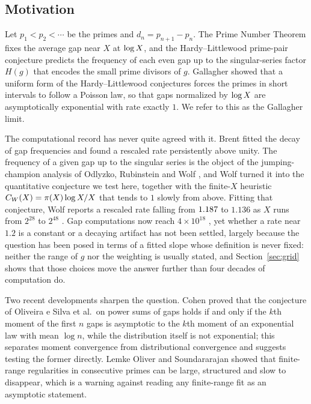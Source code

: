 \documentclass[11pt,a4paper]{article}
\begin{document}
\subsection{Motivation}

Let $p_1<p_2<\cdots$ be the primes and $d_n=p_{n+1}-p_n$. The Prime Number Theorem fixes the average gap near $X$ at $\log X$, and the Hardy--Littlewood prime-pair conjecture \cite{HardyLittlewood1923} predicts the frequency of each even gap up to the singular-series factor $H(g)$ that encodes the small prime divisors of $g$. Gallagher \cite{Gallagher1976,Gallagher1981} showed that a uniform form of the Hardy--Littlewood conjectures forces the primes in short intervals to follow a Poisson law, so that gaps normalized by $\log X$ are asymptotically exponential with rate exactly $1$. We refer to this as the Gallagher limit.

The computational record has never quite agreed with it. Brent \cite{Brent1974} fitted the decay of gap frequencies and found a rescaled rate persistently above unity. The frequency of a given gap up to the singular series is the object of the jumping-champion analysis of Odlyzko, Rubinstein and Wolf \cite{OdlyzkoRubinsteinWolf1999}, and Wolf \cite{Wolf2011,Wolf2014} turned it into the quantitative conjecture we test here, together with the finite-$X$ heuristic $C_W(X)=\pi(X)\log X/X$ that tends to $1$ slowly from above. Fitting that conjecture, Wolf reports a rescaled rate falling from $1.187$ to $1.136$ as $X$ runs from $2^{28}$ to $2^{48}$ \cite{Wolf2011}. Gap computations now reach $4\times10^{18}$ \cite{OliveiraeSilvaHerzogPardi2014}, yet whether a rate near $1.2$ is a constant or a decaying artifact has not been settled, largely because the question has been posed in terms of a fitted slope whose definition is never fixed: neither the range of $g$ nor the weighting is usually stated, and Section~\ref{sec:grid} shows that those choices move the answer further than four decades of computation do.

Two recent developments sharpen the question. Cohen \cite{Cohen2025} proved that the conjecture of Oliveira e Silva et al.\ on power sums of gaps holds if and only if the $k$th moment of the first $n$ gaps is asymptotic to the $k$th moment of an exponential law with mean $\log n$, while the distribution itself is not exponential; this separates moment convergence from distributional convergence and suggests testing the former directly. Lemke Oliver and Soundararajan \cite{LemkeOliverSoundararajan2016} showed that finite-range regularities in consecutive primes can be large, structured and slow to disappear, which is a warning against reading any finite-range fit as an asymptotic statement.
\end{document}
